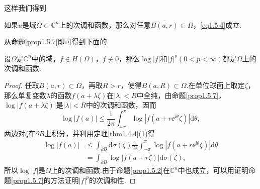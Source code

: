 这样我们得到
\begin{prop}\label{prop1.5.10}
	如果$u$是域$\Omega\subset\mathbb{C}^n$上的次调和函数，那么对任意$\bar{B(a,r)}\subset\Omega$，\eqref{eq1.5.4}成立.
\end{prop}
从命题\ref{prop1.5.7}即可得到下面的.
\begin{prop}\label{prop1.5.11}
	设$\Omega$是$\mathbb{C}^n$中的域，$f\in H(\Omega)$，$f\not\equiv0$，那么$\log|f|$和$|f|^p(0<p<\infty)$都是$\Omega$上的次调和函数.
\end{prop}
\begin{proof}
	任取$B(a,r)\subset\Omega$，再取$R>r$，使得$B(a,R)\subset\Omega$.在单位球面上取定$\zeta$，那么单复变数$\lambda$的函数$f(a+\lambda\zeta)$在$|\lambda|<R$中全纯，由命题\ref{prop1.5.7}，$\log|f(a+\lambda\zeta)|$是$|\lambda|<R$中的次调和函数，因而
	\[\log|f(a)|\le\frac1{2\pi}\int_{-\pi}^{\pi}\log|f(a+r\ee^{\ii\theta}\zeta)|\mathrm{d}\theta,\]
	两边对$\zeta$在$\partial B$上积分，并利用定理\ref{thm1.4.4}\hyperlink{1.4.4}{(1)}得
	\begin{align*}
		\log|f(a)|
		&\le \int_{\partial B}\mathrm{d}\sigma(\zeta)\frac1{2\pi}\int_{-\pi}^{\pi}\log|f(a+r\ee^{\ii\theta}\zeta)|\mathrm{d}\theta\\
		&=\int_{\partial B}\log|f(a+r\zeta)|\mathrm{d}\sigma(\zeta),
	\end{align*}
所以$\log|f|$是$\Omega$上的次调和函数.由于命题\ref{prop1.5.2}在$\mathbb{C}^n$中也成立，可以用证明命题\ref{prop1.5.7}的方法证明$|f|^p$的次调和性.
\end{proof}
